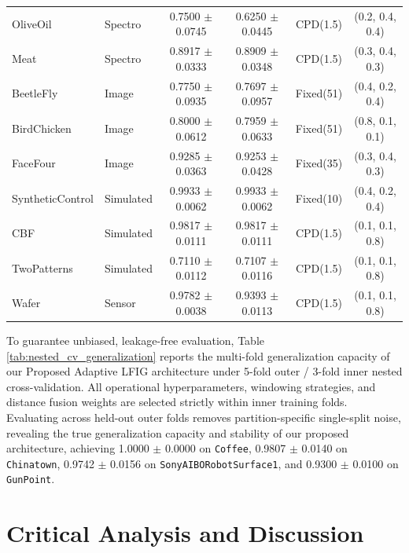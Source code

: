 \documentclass[conference]{IEEEtran}
\begin{document}
\begin{table}[!t]
\begin{tabular}{|>{\raggedright\arraybackslash}p{3.6cm}|>{\raggedright\arraybackslash}p{1.6cm}|c|c|c|c|}
OliveOil               & Spectro   & 0.7500 $\pm$ 0.0745   & 0.6250 $\pm$ 0.0445   & CPD(1.5)    & (0.2, 0.4, 0.4) \\
Meat                   & Spectro   & 0.8917 $\pm$ 0.0333   & 0.8909 $\pm$ 0.0348   & CPD(1.5)    & (0.3, 0.4, 0.3) \\
BeetleFly              & Image     & 0.7750 $\pm$ 0.0935   & 0.7697 $\pm$ 0.0957   & Fixed(51)   & (0.4, 0.2, 0.4) \\
BirdChicken            & Image     & 0.8000 $\pm$ 0.0612   & 0.7959 $\pm$ 0.0633   & Fixed(51)   & (0.8, 0.1, 0.1) \\
FaceFour               & Image     & 0.9285 $\pm$ 0.0363   & 0.9253 $\pm$ 0.0428   & Fixed(35)   & (0.3, 0.4, 0.3) \\
SyntheticControl       & Simulated & 0.9933 $\pm$ 0.0062   & 0.9933 $\pm$ 0.0062   & Fixed(10)   & (0.4, 0.2, 0.4) \\
CBF                    & Simulated & 0.9817 $\pm$ 0.0111   & 0.9817 $\pm$ 0.0111   & CPD(1.5)    & (0.1, 0.1, 0.8) \\
TwoPatterns            & Simulated & 0.7110 $\pm$ 0.0112   & 0.7107 $\pm$ 0.0116   & CPD(1.5)    & (0.1, 0.1, 0.8) \\
Wafer                  & Sensor    & 0.9782 $\pm$ 0.0038   & 0.9393 $\pm$ 0.0113   & CPD(1.5)    & (0.1, 0.1, 0.8) \\ \hline
\end{tabular}
\end{table}

To guarantee unbiased, leakage-free evaluation, Table \ref{tab:nested_cv_generalization} reports the multi-fold generalization capacity of our Proposed Adaptive LFIG architecture under 5-fold outer / 3-fold inner nested cross-validation. All operational hyperparameters, windowing strategies, and distance fusion weights are selected strictly within inner training folds. Evaluating across held-out outer folds removes partition-specific single-split noise, revealing the true generalization capacity and stability of our proposed architecture, achieving 1.0000 $\pm$ 0.0000 on \texttt{Coffee}, 0.9807 $\pm$ 0.0140 on \texttt{Chinatown}, 0.9742 $\pm$ 0.0156 on \texttt{SonyAIBORobotSurface1}, and 0.9300 $\pm$ 0.0100 on \texttt{GunPoint}.

\section{Critical Analysis and Discussion}
\end{document}

